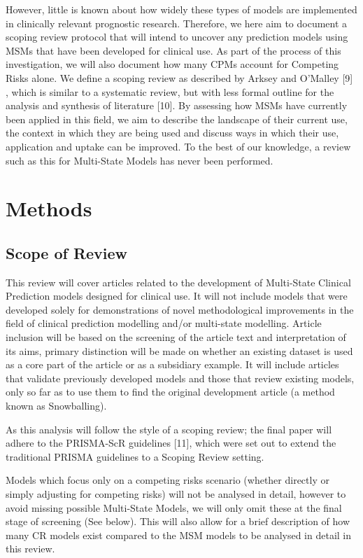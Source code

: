 \documentclass[12pt,PhD,twoside,openright]{muthesis}
\begin{document}
However, little is known about how widely these types of models are implemented in clinically relevant prognostic research. Therefore, we here aim to document a scoping review protocol that will intend to uncover any prediction models using MSMs that have been developed for clinical use. As part of the process of this investigation, we will also document how many CPMs account for Competing Risks alone. We define a scoping review as described by Arksey and O'Malley {[}9{]} , which is similar to a systematic review, but with less formal outline for the analysis and synthesis of literature {[}10{]}. By assessing how MSMs have currently been applied in this field, we aim to describe the landscape of their current use, the context in which they are being used and discuss ways in which their use, application and uptake can be improved. To the best of our knowledge, a review such as this for Multi-State Models has never been performed.

\hypertarget{methods}{%
\section{Methods}\label{methods}}

\hypertarget{scope-of-review}{%
\subsection{Scope of Review}\label{scope-of-review}}

This review will cover articles related to the development of Multi-State Clinical Prediction models designed for clinical use. It will not include models that were developed solely for demonstrations of novel methodological improvements in the field of clinical prediction modelling and/or multi-state modelling. Article inclusion will be based on the screening of the article text and interpretation of its aims, primary distinction will be made on whether an existing dataset is used as a core part of the article or as a subsidiary example. It will include articles that validate previously developed models and those that review existing models, only so far as to use them to find the original development article (a method known as Snowballing).

As this analysis will follow the style of a scoping review; the final paper will adhere to the PRISMA-ScR guidelines {[}11{]}, which were set out to extend the traditional PRISMA guidelines to a Scoping Review setting.

Models which focus only on a competing risks scenario (whether directly or simply adjusting for competing risks) will not be analysed in detail, however to avoid missing possible Multi-State Models, we will only omit these at the final stage of screening (See below). This will also allow for a brief description of how many CR models exist compared to the MSM models to be analysed in detail in this review.
\end{document}
